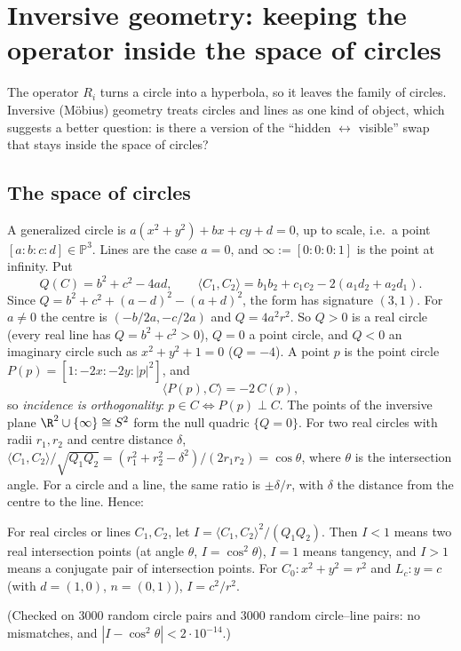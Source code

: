\section{Inversive geometry: keeping the operator inside the space of circles}\label{sec:inv}
The operator $R_i$ turns a circle into a hyperbola, so it leaves the family of circles. Inversive (Möbius) geometry treats circles and lines as one kind of object, which suggests a better question: is there a version of the ``hidden $\leftrightarrow$ visible'' swap that stays inside the space of circles?

\subsection{The space of circles}
A generalized circle is $a(x^2+y^2)+bx+cy+d=0$, up to scale, i.e.\ a point $[a:b:c:d]\in\mathbb{P}^3$. Lines are the case $a=0$, and $\infty:=[0:0:0:1]$ is the point at infinity. Put
\[ Q(C)=b^2+c^2-4ad,\qquad \langle C_1,C_2\rangle=b_1b_2+c_1c_2-2(a_1d_2+a_2d_1). \]
Since $Q=b^2+c^2+(a-d)^2-(a+d)^2$, the form has signature $(3,1)$. For $a\neq0$ the centre is $(-b/2a,-c/2a)$ and $Q=4a^2r^2$. So $Q>0$ is a real circle (every real line has $Q=b^2+c^2>0$), $Q=0$ a point circle, and $Q<0$ an imaginary circle such as $x^2+y^2+1=0$ ($Q=-4$). A point $p$ is the point circle $P(p)=[1:-2x:-2y:|p|^2]$, and
\[ \langle P(p),C\rangle=-2\,C(p), \]
so \emph{incidence is orthogonality}: $p\in C\iff P(p)\perp C$. The points of the inversive plane $\R^2\cup\{\infty\}\cong S^2$ form the null quadric $\{Q=0\}$. For two real circles with radii $r_1,r_2$ and centre distance $\delta$, $\langle C_1,C_2\rangle/\sqrt{Q_1Q_2}=(r_1^2+r_2^2-\delta^2)/(2r_1r_2)=\cos\theta$, where $\theta$ is the intersection angle. For a circle and a line, the same ratio is $\pm\delta/r$, with $\delta$ the distance from the centre to the line. Hence:

\begin{proposition}\label{prop:inv}
For real circles or lines $C_1,C_2$, let $I=\langle C_1,C_2\rangle^2/(Q_1Q_2)$. Then $I<1$ means two real intersection points (at angle $\theta$, $I=\cos^2\theta$), $I=1$ means tangency, and $I>1$ means a conjugate pair of intersection points. For $C_0:x^2+y^2=r^2$ and $L_c:y=c$ (with $d=(1,0)$, $n=(0,1)$), $I=c^2/r^2$.
\end{proposition}
\noindent(Checked on 3000 random circle pairs and 3000 random circle–line pairs: no mismatches, and $|I-\cos^2\theta|<2\cdot10^{-14}$.)

